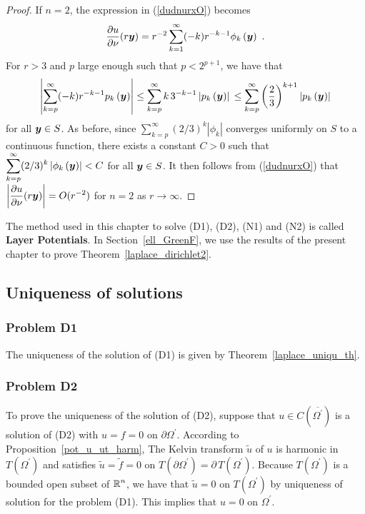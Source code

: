 \begin{proof}
 If $n=2$, the expression in (\ref{dudnurxO}) becomes
\[
\pdydx{u}{\nu}(r \VEC{y})  
= r^{-2} \sum_{k=1}^\infty (-k) r^{-k-1} \phi_k\left(\VEC{y}\right) \ .
\]
For $r>3$ and $p$ large enough such that $\displaystyle p < 2^{p+1}$,
we have that
\[
\left| \sum_{k=p}^{\infty} (-k) r^{-k-1} p_k\left({\bm{y}}\right) \right|
\leq \sum_{k=p}^{\infty} k\, 3^{-k-1} \left| p_k\left({\bm{y}}\right) \right| \\
\leq \sum_{k=p}^{\infty} \left(\frac{2}{3}\right)^{k+1}
\left| p_k\left({\bm{y}}\right) \right|
\]
for all ${\bm{y}} \in S$.  As before, since
$\displaystyle \sum_{k=p}^{\infty} (2/3)^k |\phi_k|$
converges uniformly on $S$ to a continuous function, there exists a
constant $C>0$ such that
$\displaystyle \sum_{k=p}^{\infty} (2/3)^k \left|
  \phi_k\left({\bm{y}}\right) \right| < C$
for all ${\bm{y}} \in S$.  It then follows
from (\ref{dudnurxO}) that
$\displaystyle \left| \frac{\partial{u}}{\partial \nu}(r {\bm{y}}) \right| = O(r^{-2})$
for $n=2$ as $r \to \infty$.
\end{proof}

\begin{rmk}
The method used in this chapter to solve (D1), (D2), (N1) and (N2) is called
{\bfseries Layer Potentials}.
In Section~\ref{ell_GreenF}, we use the results of the present chapter
to prove Theorem~\ref{laplace_dirichlet2}.
\end{rmk}

\subsection{Uniqueness of solutions} \label{pot_sect_unique}

\subsubsection{Problem D1}
The uniqueness of the solution of (D1) is given by
Theorem~\ref{laplace_uniqu_th}.

\subsubsection{Problem D2}
To prove the uniqueness of the solution of (D2), suppose
that $\displaystyle u \in C(\overline{\Omega^{\prime}})$ is a solution
of (D2) with $u = f = 0$ on $\displaystyle \partial \Omega^{\prime}$.
According to Proposition~\ref{pot_u_ut_harm}, The Kelvin transform
$\tilde{u}$ of $u$ is harmonic in $\displaystyle T(\Omega^{\prime})$
and satisfies $\tilde{u} = \tilde{f} = 0$ on
$\displaystyle T(\partial \Omega^{\prime}) = \partial\,T(\Omega^{\prime})$.
Because $\displaystyle T(\Omega^{\prime})$
is a bounded open subset of $\displaystyle \mathbb{R}^n$, we have that
$\tilde{u} = 0$ on $\displaystyle T(\Omega^{\prime})$
by uniqueness of solution for the problem (D1). 
This implies that $u =0$ on $\displaystyle \Omega^{\prime}$.

